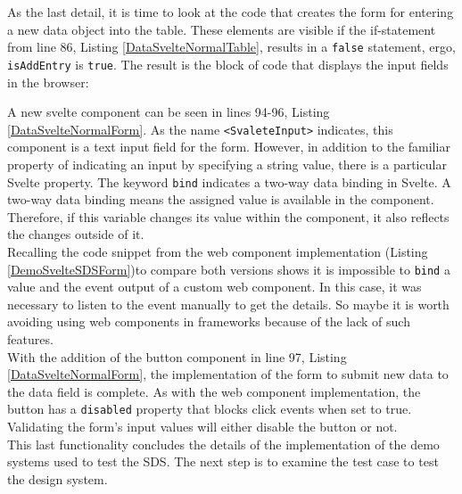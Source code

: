 As the last detail, it is time to look at the code that creates the form for entering a new data object into the table. These elements are visible if the if-statement from line 86, Listing \ref{DataSvelteNormalTable}, results in a \texttt{false} statement, ergo, \texttt{isAddEntry} is \texttt{true}. The result is the block of code that displays the input fields in the browser:

A new svelte component can be seen in lines 94-96, Listing \ref{DataSvelteNormalForm}. As the name \texttt{<SvaleteInput>} indicates, this component is a text input field for the form. However, in addition to the familiar property of indicating an input by specifying a string value, there is a particular Svelte property. The keyword \texttt{bind} indicates a two-way data binding in Svelte. A two-way data binding means the assigned value is available in the component. Therefore, if this variable changes its value within the component, it also reflects the changes outside of it. \\  
Recalling the code snippet from the web component implementation (Listing \ref{DemoSvelteSDSForm})to compare both versions shows it is impossible to \texttt{bind} a value and the event output of a custom web component. In this case, it was necessary to listen to the event manually to get the details. So maybe it is worth avoiding using web components in frameworks because of the lack of such features. \\
With the addition of the button component in line 97, Listing \ref{DataSvelteNormalForm}, the implementation of the form to submit new data to the data field is complete. As with the web component implementation, the button has a \texttt{disabled} property that blocks click events when set to true. Validating the form's input values will either disable the button or not. \\


This last functionality concludes the details of the implementation of the demo systems used to test the SDS. The next step is to examine the test case to test the design system. 
